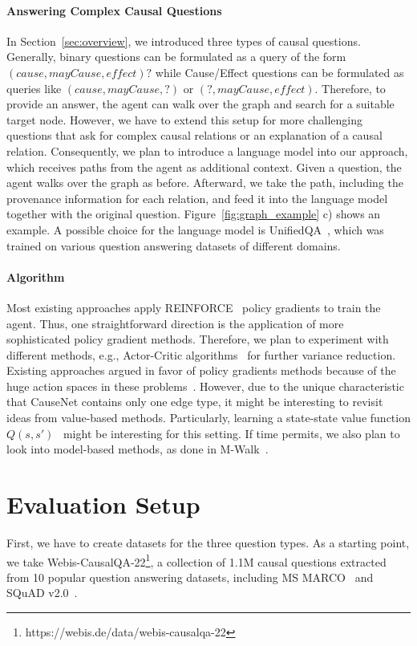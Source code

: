 \paragraph{Answering Complex Causal Questions}

In Section~\ref{sec:overview}, we introduced three types of causal questions. 
Generally, binary questions can be formulated as a query of the form $(cause, mayCause, \mathit{effect})?$ while Cause/Effect questions can be formulated as queries like 
$(cause, mayCause, ?)$ or $(?, mayCause, \mathit{effect})$. Therefore, to provide an answer, the agent can walk over the graph and search for a suitable target node. However, we have to extend this setup for more challenging questions that ask for complex causal relations or an explanation of a causal relation. 
Consequently, we plan to introduce a language model into our approach, which receives paths from the agent as additional context. Given a question, the agent walks over the graph as before. Afterward, we take the path, including the provenance information for each relation, and feed it into the language model together with the original question. 
Figure~\ref{fig:graph_example} c) shows an example. A possible choice for the language model is UnifiedQA~\cite{Khashabi2020UnifiedQA, Khashabi2022UnifiedQA2}, which was trained on various question answering datasets of different domains. 

\paragraph{Algorithm}
Most existing approaches apply REINFORCE~\cite{Williams1992REINFORCE} policy gradients to train the agent. Thus, one straightforward direction is the application of more sophisticated policy gradient methods. Therefore, we plan to experiment with different methods, e.g., Actor-Critic algorithms~\cite{Mnih2016A2C} for further variance reduction. Existing approaches argued in favor of policy gradients methods because of the huge action spaces in these problems~\cite{Xiong2017DeePpath, Kaiser2021Reinforcement}. However, due to the unique characteristic that CauseNet contains only one edge type, it might be interesting to revisit ideas from value-based methods. Particularly, learning a state-state value function $Q(s, s')$~\cite{Edwards2020State} might be interesting for this setting. If time permits, we also plan to look into model-based methods, as done in M-Walk~\cite{Shen2018MWalk}.

\section{Evaluation Setup}
First, we have to create datasets for the three question types. As a starting point, we take Webis-CausalQA-22\footnote{https://webis.de/data/webis-causalqa-22}, a collection of 1.1M causal questions extracted from 10 popular question answering datasets, including MS MARCO~\cite{Nguyen2016MSMARCO} and SQuAD v2.0~\cite{Rajpurkar2018SQUAD2}. 

